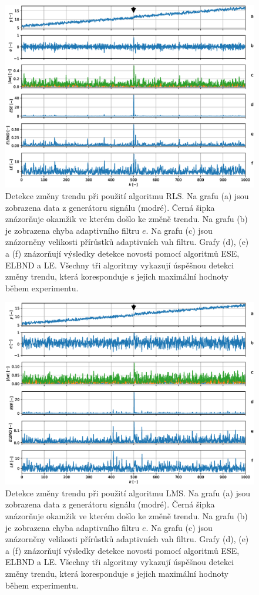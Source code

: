 \begin{figure}[ht!]
\centering
\includegraphics[scale=0.60]{IMG/mdpi/trendchange_rls.eps}
\caption{Detekce změny trendu při použití algoritmu RLS. Na grafu (a) jsou zobrazena data z generátoru signálu (modré). Černá šipka znázorňuje okamžik ve kterém došlo ke změně trendu. Na grafu (b) je zobrazena chyba adaptivního filtru $e$. Na grafu (c) jsou znázorněny velikosti přírůstků adaptivních vah filtru. Grafy (d), (e) a (f) znázorňují výsledky detekce novosti pomocí algoritmů ESE, ELBND a LE. Všechny tři algoritmy vykazují úspěšnou detekci změny trendu, která koresponduje s jejich maximální hodnoty během experimentu.}
\label{fig:trend_change_rls}
\end{figure}

\begin{figure}[ht!]
    \centering
    \includegraphics[scale=0.60]{IMG/mdpi/trendchange_lms.eps}
    \caption{Detekce změny trendu při použití algoritmu LMS. Na grafu (a) jsou zobrazena data z generátoru signálu (modré). Černá šipka znázorňuje okamžik ve kterém došlo ke změně trendu. Na grafu (b) je zobrazena chyba adaptivního filtru $e$. Na grafu (c) jsou znázorněny velikosti přírůstků adaptivních vah filtru. Grafy (d), (e) a (f) znázorňují výsledky detekce novosti pomocí algoritmů ESE, ELBND a LE. Všechny tři algoritmy vykazují úspěšnou detekci změny trendu, která koresponduje s jejich maximální hodnoty během experimentu.}
\label{fig:trend_change_lms}
\end{figure}
